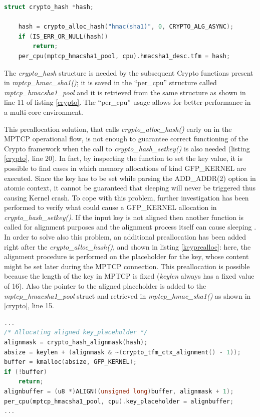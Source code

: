 \begin{lstlisting}[language=c, caption=Initializing the Crypto-API framework, label=cryptoalloc]
	struct crypto_hash *hash;

	hash = crypto_alloc_hash("hmac(sha1)", 0, CRYPTO_ALG_ASYNC);
	if (IS_ERR_OR_NULL(hash))
		return;
	per_cpu(mptcp_hmacsha1_pool, cpu).hmacsha1_desc.tfm = hash;
\end{lstlisting}

The \textit{crypto\_hash} structure is needed by the subsequent Crypto functions present in \textit{mptcp\_hmac\_sha1()}; it is saved in the ``per\_cpu'' structure called \textit{mptcp\_hmacsha1\_pool} and it is retrieved from the same structure as shown in line 11 of listing \ref{crypto}. The ``per\_cpu'' usage allows for better performance in a multi-core environment.

This preallocation solution, that calls \textit{crypto\_alloc\_hash()} early on in the MPTCP operational flow, is not enough to guarantee correct functioning of the Crypto framework when the call to \textit{crypto\_hash\_setkey()} is also needed (listing \ref{crypto}, line 20). In fact, by inspecting the function to set the key value, it is possible to find cases in which memory allocations of kind GFP\_KERNEL are executed. Since the key has to be set while parsing the ADD\_ADDR(2) option in atomic context, it cannot be guaranteed that sleeping will never be triggered thus causing Kernel crash. To cope with this problem, further investigation has been performed to verify what could cause a GFP\_KERNEL allocation in \textit{crypto\_hash\_setkey()}. If the input key is not aligned then another function \cite{shash61} is called for alignment purposes and the alignment process itself can cause sleeping \cite{shash43}. In order to solve also this problem, an additional preallocation has been added right after the  \textit{crypto\_alloc\_hash()}, and shown in listing \ref{keyprealloc}: here, the alignment procedure is performed on the placeholder for the key, whose content might be set later during the MPTCP connection. This preallocation is possible because the length of the key in MPTCP is fixed (\textit{keylen} always has a fixed value of 16).
Also the pointer to the aligned placeholder is added to the \textit{mptcp\_hmacsha1\_pool} struct and retrieved in \textit{mptcp\_hmac\_sha1()} as shown in \ref{crypto}, line 15. 

\begin{lstlisting}[language=c, caption=Preallocating an aligned placeholder for the HMAC key, label=keyprealloc]
...
/* Allocating aligned key_placeholder */
alignmask = crypto_hash_alignmask(hash);
absize = keylen + (alignmask & ~(crypto_tfm_ctx_alignment() - 1));
buffer = kmalloc(absize, GFP_KERNEL);
if (!buffer)
	return;
alignbuffer = (u8 *)ALIGN((unsigned long)buffer, alignmask + 1);
per_cpu(mptcp_hmacsha1_pool, cpu).key_placeholder = alignbuffer;
...
\end{lstlisting}

